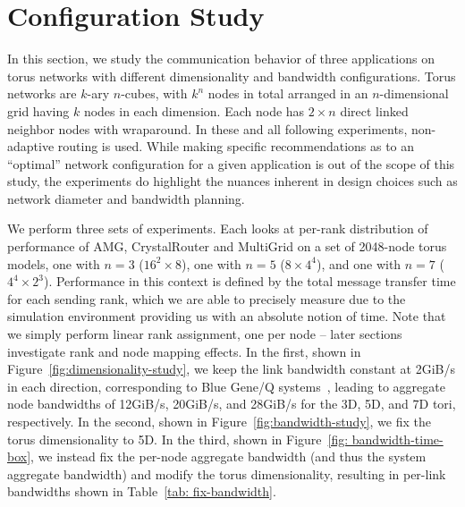 \section{Configuration Study}
\label{sec:config study}

In this section, we study the communication behavior of three applications on torus networks with different dimensionality and bandwidth configurations. Torus networks are $k$-ary $n$-cubes, with $k^{n}$ nodes in total arranged in an $n$-dimensional grid having $k$ nodes in each dimension. Each node has $2\times n$ direct linked neighbor nodes with wraparound. In these and all following experiments, non-adaptive routing is used. While making specific recommendations as to an ``optimal'' network configuration for a given application is out of the scope of this study, the experiments do highlight the nuances inherent in design choices such as network diameter and bandwidth planning.

We perform three sets of experiments. Each looks at per-rank distribution of performance of AMG, CrystalRouter and MultiGrid on a set of 2048-node torus models, one with $n=3$ ($16^{2} \times 8$), one with $n=5$ ($8\times 4^{4}$), and one with $n=7$ ($4^{4} \times 2^{3}$). Performance in this context is defined by the total message transfer time for each sending rank, which we are able to precisely measure due to the simulation environment providing us with an absolute notion of time. Note that we simply perform linear rank assignment, one per node -- later sections investigate rank and node mapping effects. In the first, shown in Figure~\ref{fig:dimensionality-study}, we keep the link bandwidth constant at 2GiB/s in each direction, corresponding to Blue Gene/Q systems~\cite{bgq}, leading to aggregate node bandwidths of 12GiB/s, 20GiB/s, and 28GiB/s for the 3D, 5D, and 7D tori, respectively. In the second, shown in Figure~\ref{fig:bandwidth-study}, we fix the torus dimensionality to 5D. In the third, shown in Figure~\ref{fig: bandwidth-time-box}, we instead fix the per-node aggregate bandwidth (and thus the system aggregate bandwidth) and modify the torus dimensionality, resulting in per-link bandwidths shown in Table~\ref{tab: fix-bandwidth}.

